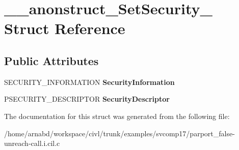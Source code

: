 \hypertarget{struct____anonstruct__SetSecurity__66}{}\section{\+\_\+\+\_\+anonstruct\+\_\+\+Set\+Security\+\_ Struct Reference}
\label{struct____anonstruct__SetSecurity__66}
\subsection*{Public Attributes}
\begin{DoxyCompactItemize}
\item 
\hypertarget{struct____anonstruct__SetSecurity__66_a180d1e9cb61328ed05e45780229139a1}{}S\+E\+C\+U\+R\+I\+T\+Y\+\_\+\+I\+N\+F\+O\+R\+M\+A\+T\+I\+O\+N {\bfseries Security\+Information}\label{struct____anonstruct__SetSecurity__66_a180d1e9cb61328ed05e45780229139a1}

\item 
\hypertarget{struct____anonstruct__SetSecurity__66_a0a743d613e786bb6c1ecede7a8c9791d}{}P\+S\+E\+C\+U\+R\+I\+T\+Y\+\_\+\+D\+E\+S\+C\+R\+I\+P\+T\+O\+R {\bfseries Security\+Descriptor}\label{struct____anonstruct__SetSecurity__66_a0a743d613e786bb6c1ecede7a8c9791d}

\end{DoxyCompactItemize}


The documentation for this struct was generated from the following file\+:\begin{DoxyCompactItemize}
\item 
/home/arnabd/workspace/civl/trunk/examples/svcomp17/parport\+\_\+false-\/unreach-\/call.\+i.\+cil.\+c\end{DoxyCompactItemize}
